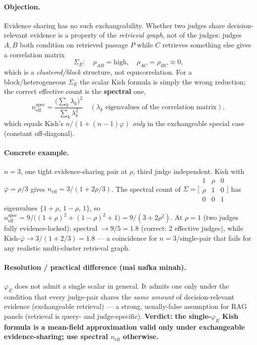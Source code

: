 \documentclass[11pt,a4paper]{article}
\begin{document}
\paragraph{Objection.}
Evidence sharing has no such exchangeability.
Whether two judges share decision-relevant evidence is a property of the \emph{retrieval graph},
not of the judges: judges $A,B$ both condition on retrieved passage $P$ while $C$ retrieves
something else gives a correlation matrix
\[
  \Sigma_E: \quad \rho_{AB} = \text{high},\quad \rho_{AC} = \rho_{BC} \approx 0,
\]
which is a \emph{clustered/block} structure, not equicorrelation.
For a block/heterogeneous $\Sigma_E$ the scalar Kish formula is simply the wrong reduction;
the correct effective count is the \textbf{spectral} one,
\[
  n_{\mathrm{eff}}^{\mathrm{spec}} = \frac{\bigl(\sum_k \lambda_k\bigr)^2}{\sum_k \lambda_k^2}
  \quad (\lambda_k \text{ eigenvalues of the correlation matrix}),
\]
which equals Kish's $n/(1+(n-1)\varphi)$ \emph{only} in the exchangeable special case
(constant off-diagonal).

\paragraph{Concrete example.}
$n=3$, one tight evidence-sharing pair at $\rho$, third judge independent.
Kish with $\bar\varphi = \rho/3$ gives $n_{\mathrm{eff}} = 3/(1+2\rho/3)$.
The spectral count of
$\Sigma = \bigl[\begin{smallmatrix}1&\rho&0\\\rho&1&0\\0&0&1\end{smallmatrix}\bigr]$
has eigenvalues $\{1+\rho,\,1-\rho,\,1\}$, so
$n_{\mathrm{eff}}^{\mathrm{spec}} = 9/\bigl((1+\rho)^2+(1-\rho)^2+1\bigr) = 9/(3+2\rho^2)$.
At $\rho=1$ (two judges fully evidence-locked): spectral $\to 9/5 = 1.8$ (correct: 2 effective
judges), while Kish-$\bar\varphi \to 3/(1+2/3) = 1.8$ --- a coincidence for $n=3$/single-pair
that fails for any realistic multi-cluster retrieval graph.

\paragraph{Resolution / practical difference (mai nafka minah).}
$\varphi_E$ does not admit a single scalar in general.
It admits one only under the condition that every judge-pair shares the \emph{same amount} of
decision-relevant evidence (exchangeable retrieval) --- a strong, usually-false assumption for RAG
panels (retrieval is query- and judge-specific).
\textbf{Verdict: the single-$\varphi_E$ Kish formula is a mean-field approximation valid only
under exchangeable evidence-sharing; use spectral $n_{\mathrm{eff}}$ otherwise.}
\end{document}
